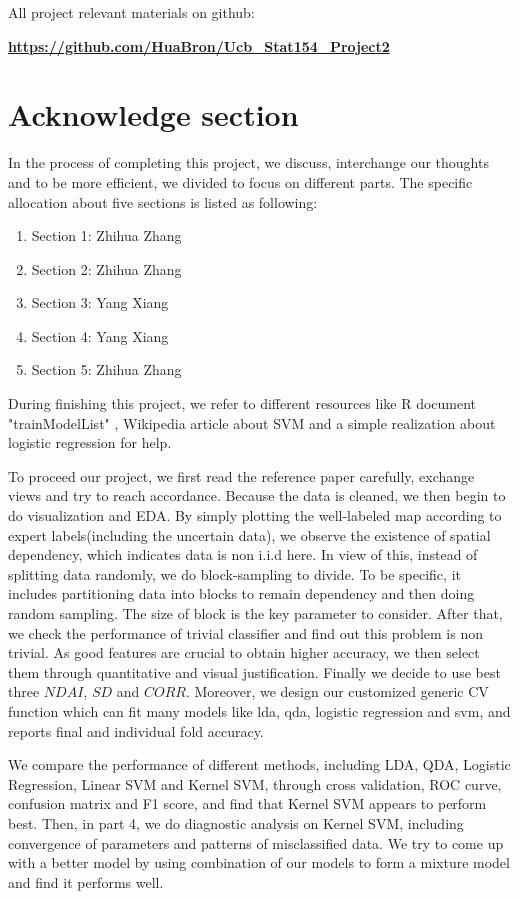 \documentclass[11pt]{article}
\begin{document}
\qquad \; All project relevant materials on github:\par
\quad \href{https://github.com/HuaBron/Ucb_Stat154_Project2.git}{\textbf{https://github.com/HuaBron/Ucb\_Stat154\_Project2}}

\newpage

\section*{Acknowledge section}
\quad In the process of completing this project, we discuss, interchange our thoughts and to be more efficient, we divided to focus on different parts. The specific allocation about five sections is listed as following:
\begin{enumerate}
	\item[] Section 1: Zhihua Zhang
	\item[] Section 2: Zhihua Zhang
	\item[] Section 3: Yang Xiang
	\item[] Section 4: Yang Xiang
	\item[] Section 5: Zhihua Zhang
\end{enumerate}
\quad During finishing this project, we refer to different resources like R document "trainModelList" \cite{RtrainModelList}, Wikipedia article about SVM \cite{SVMwiki} and a simple realization about logistic regression \cite{LogisticExample} for help.\par
\quad To proceed our project, we first read the reference paper carefully, exchange views and try to reach accordance. Because the data is cleaned, we then begin to do visualization and EDA. By simply plotting the well-labeled map according to expert labels(including the uncertain data), we observe the existence of spatial dependency, which indicates data is non i.i.d here. In view of this, instead of splitting data randomly, we do block-sampling to divide. To be specific, it includes partitioning data into blocks to remain dependency and then doing random sampling. The size of block is the key parameter to consider. After that, we check the performance of trivial classifier and find out this problem is non trivial. As good features are crucial to obtain higher accuracy, we then select them through quantitative and visual justification. Finally we decide to use best three $NDAI$, $SD$ and $CORR$. Moreover, we design our customized generic CV function which can fit many models like lda, qda, logistic regression and svm, and reports final and individual fold accuracy.\par
\quad We compare the performance of different methods, including LDA, QDA, Logistic Regression, Linear SVM and Kernel SVM, through cross validation, ROC curve, confusion matrix and F1 score, and find that Kernel SVM appears to perform best. Then, in part 4, we do diagnostic analysis on Kernel SVM, including convergence of parameters and patterns of misclassified data. We try to come up with a better model by using combination of our models to form a mixture model and find it performs well.







\renewcommand\refname{} 
 

\end{document}

